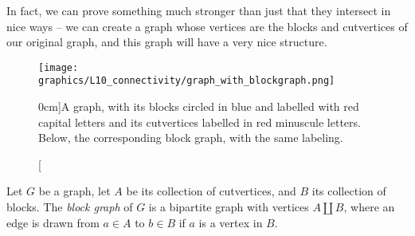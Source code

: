 \documentclass[nobib]{tufte-handout}
\begin{document}
In fact, we can prove something much stronger than just that they intersect in nice ways -- we can create a graph whose vertices are the blocks and cutvertices of our original graph, and this graph will have a very nice structure.

\begin{figure}
  \centering
  \texttt{[image: graphics/L10\_connectivity/graph\_with\_blockgraph.png]}
  \caption[][0cm]{A graph, with its blocks circled in blue and labelled with red capital letters and its cutvertices labelled in red minuscule letters. Below, the corresponding block graph, with the same labeling.}
  \label{fig:graph_with_blockgraph}
\end{figure}

\begin{definition}
  Let $G$ be a graph, let $A$ be its collection of cutvertices, and $B$ its collection of blocks. The \emph{block graph} of $G$ is a bipartite graph with vertices $A \coprod B$, where an edge is drawn from $a\in A$ to $b\in B$ if $a$ is a vertex in $B$.
\end{definition}
\end{document}
